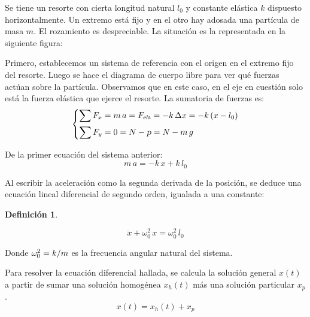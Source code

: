 \documentclass[a5paper,12pt,twoside]{book}
\newtheorem{defn}{{Definición}}[chapter]
\begin{document}
Se tiene un resorte con cierta longitud natural $l_0$ y constante elástica $k$ dispuesto horizontalmente. Un extremo está fijo y en el otro hay adosada una partícula de masa $m$. El rozamiento es despreciable. La situación es la representada en la siguiente figura:

\begin{center}
    \def\svgwidth{0.7\linewidth}
    
\end{center}

Primero, establecemos un sistema de referencia con el origen en el extremo fijo del resorte. Luego se hace el diagrama de cuerpo libre para ver qué fuerzas actúan sobre la partícula. Observamos que en este caso, en el eje en cuestión solo está la fuerza elástica que ejerce el resorte. La sumatoria de fuerzas es:
\begin{equation*}
    \left\{
    \begin{aligned}
        \sum F_x &= m \, a = {{F}_\textsl{{ela}}} = - k \, \Delta x = - k \left(x-l_0\right)
        \\
        \sum F_y &= 0 = N - \textsl{p} = N - m \, g
    \end{aligned}
    \right.
\end{equation*}

De la primer ecuación del sistema anterior:
\begin{equation*}
    m \, a = -k \, x + k \, l_0
\end{equation*}

Al escribir la aceleración como la segunda derivada de la posición, se deduce una ecuación lineal diferencial de segundo orden, igualada a una constante:

\begin{mdframed}[style=MyFrame1]
    \begin{defn}
    \end{defn}
    \begin{equation*}
        \ddot{x} + \omega_0^2 \, x = \omega_0^2 \, l_0
    \end{equation*}
\end{mdframed}

Donde $\omega_0^2 = k/m$ es la frecuencia angular natural del sistema.

Para resolver la ecuación diferencial hallada, se calcula la solución general $x(t)$ a partir de sumar una solución homogénea $x_h(t)$ más una solución particular $x_p$.
\[ x(t) = x_h(t) + x_p \]
\end{document}
